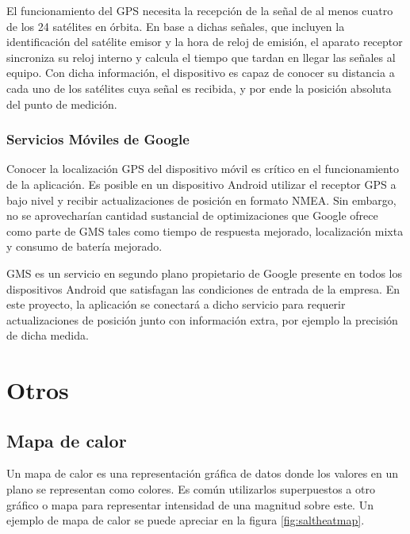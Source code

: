 El funcionamiento del \ac{GPS} necesita la recepción de la señal de al menos cuatro de los 24 satélites en órbita. En base a dichas señales, que incluyen la identificación del satélite emisor y la hora de reloj de emisión, el aparato receptor sincroniza su reloj interno y calcula el tiempo que tardan en llegar las señales al equipo. Con dicha información, el dispositivo es capaz de conocer su distancia a cada uno de los satélites cuya señal es recibida, y por ende la posición absoluta del punto de medición.

\subsubsection{Servicios Móviles de Google}
Conocer la localización \ac{GPS} del dispositivo móvil es crítico en el funcionamiento de la aplicación. Es posible en un dispositivo Android utilizar el receptor \ac{GPS} a bajo nivel y recibir actualizaciones de posición en formato NMEA. Sin embargo, no se aprovecharían cantidad sustancial de optimizaciones que Google ofrece como parte de \ac{GMS} tales como tiempo de respuesta mejorado, localización mixta y consumo de batería mejorado. 

GMS es un servicio en segundo plano propietario de Google presente en todos los dispositivos Android que satisfagan las condiciones de entrada de la empresa. En este proyecto, la aplicación se conectará a dicho servicio para requerir actualizaciones de posición junto con información extra, por ejemplo la precisión de dicha medida.

\section{Otros}

\subsection{Mapa de calor}
Un mapa de calor es una representación gráfica de datos donde los valores en un plano se representan como colores. Es común utilizarlos superpuestos a otro gráfico o mapa para representar intensidad de una magnitud sobre este. Un ejemplo de mapa de calor se puede apreciar en la figura \ref{fig:saltheatmap}.

